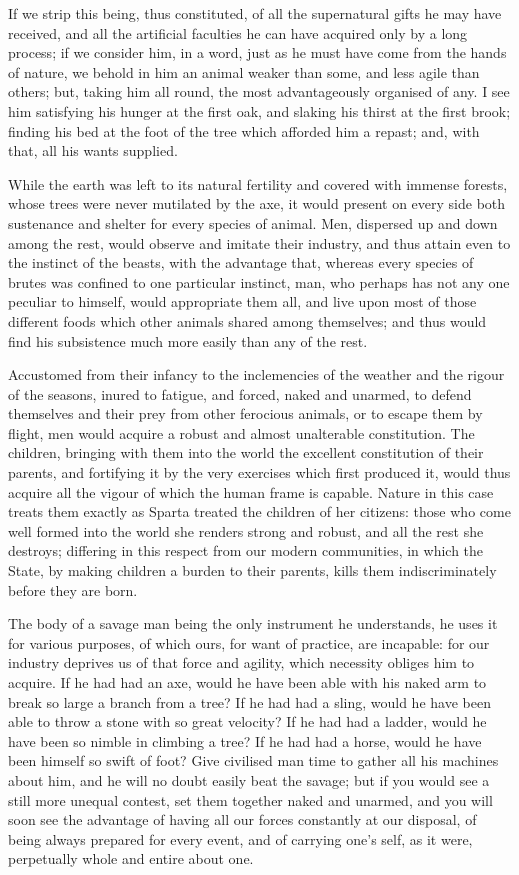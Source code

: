 \documentclass[12pt]{report}
\begin{document}
If we strip this being, thus constituted, of all the supernatural gifts he may have received, and all the artificial faculties he can have acquired only by a long process; if we consider him, in a word, just as he must have come from the hands of nature, we behold in him an animal weaker than some, and less agile than others; but, taking him all round, the most advantageously organised of any. I see him satisfying his hunger at the first oak, and slaking his thirst at the first brook; finding his bed at the foot of the tree which afforded him a repast; and, with that, all his wants supplied.

While the earth was left to its natural fertility and covered with immense forests, whose trees were never mutilated by the axe, it would present on every side both sustenance and shelter for every species of animal. Men, dispersed up and down among the rest, would observe and imitate their industry, and thus attain even to the instinct of the beasts, with the advantage that, whereas every species of brutes was confined to one particular instinct, man, who perhaps has not any one peculiar to himself, would appropriate them all, and live upon most of those different foods which other animals shared among themselves; and thus would find his subsistence much more easily than any of the rest.

Accustomed from their infancy to the inclemencies of the weather and the rigour of the seasons, inured to fatigue, and forced, naked and unarmed, to defend themselves and their prey from other ferocious animals, or to escape them by flight, men would acquire a robust and almost unalterable constitution. The children, bringing with them into the world the excellent constitution of their parents, and fortifying it by the very exercises which first produced it, would thus acquire all the vigour of which the human frame is capable. Nature in this case treats them exactly as Sparta treated the children of her citizens: those who come well formed into the world she renders strong and robust, and all the rest she destroys; differing in this respect from our modern communities, in which the State, by making children a burden to their parents, kills them indiscriminately before they are born.

The body of a savage man being the only instrument he understands, he uses it for various purposes, of which ours, for want of practice, are incapable: for our industry deprives us of that force and agility, which necessity obliges him to acquire. If he had had an axe, would he have been able with his naked arm to break so large a branch from a tree? If he had had a sling, would he have been able to throw a stone with so great velocity? If he had had a ladder, would he have been so nimble in climbing a tree? If he had had a horse, would he have been himself so swift of foot? Give civilised man time to gather all his machines about him, and he will no doubt easily beat the savage; but if you would see a still more unequal contest, set them together naked and unarmed, and you will soon see the advantage of having all our forces constantly at our disposal, of being always prepared for every event, and of carrying one's self, as it were, perpetually whole and entire about one.
\end{document}
